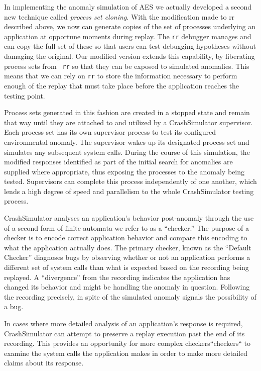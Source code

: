 In implementing the anomaly simulation of AES
we actually developed
a second new technique
called {\it process set cloning}.
With the modification made to rr described above,
we now can generate copies of the set of
processes underlying an application at opportune moments during replay.
The {\tt rr} debugger manages
and can copy
the full set of these
so that users can test debugging
hypotheses without damaging the original.
Our modified version
extends this capability, by liberating process sets from {\tt
rr} so that they can be exposed to simulated anomalies.
This means that we can rely on {\tt rr}
to store the information necessary to perform enough of the
replay that must take place before the application reaches the
testing point.

Process sets generated in this fashion are created in a stopped state and
remain that way until they are attached to and utilized by a CrashSimulator
supervisor.  Each process set has its own supervisor process to test
its configured environmental anomaly.  The
supervisor wakes up its designated process set
and simulates any
subsequent system calls.
During the course of this simulation, the modified responses identified
as part of the initial search for anomalies
are supplied where appropriate,
thus exposing the processes to the
anomaly being tested.
Supervisors can complete this
process independently of one another, which lends a
high degree of speed and
parallelism to the whole CrashSimulator testing process.

CrashSimulator analyses an application's behavior post-anomaly through the
use of a second form of finite automata we refer to as a ``checker.''  The
purpose of a checker is to encode correct application behavior and compare
this encoding to what the application actually does.
The primary checker, known as the ``Default Checker''
diagnoses bugs
by observing whether or not an application
performs a different set of system calls than what is expected based on the
recording being replayed.  A ``divergence'' from the recording indicates
the application has changed its behavior and might be handling
the anomaly in question.  Following the recording precisely, in spite of
the simulated anomaly signals the possibility of a bug.

In cases where more detailed analysis of an application's response
is required, CrashSimulator can attempt to preserve a replay execution
past the end of its recording.  This provides an opportunity for
more complex checkers``checkers`` to examine
the system calls the application makes in order to make more detailed claims about
its response.
